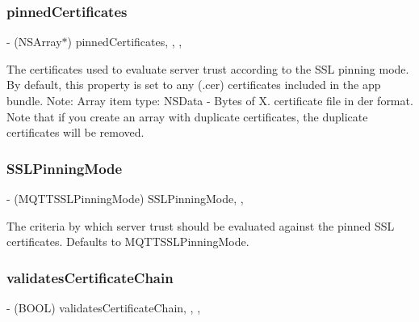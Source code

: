 \subsubsection{\texorpdfstring{pinned\+Certificates}{pinnedCertificates}}
{\footnotesize\ttfamily -\/ (N\+S\+Array$\ast$) pinned\+Certificates\hspace{0.3cm}{\ttfamily [read]}, {\ttfamily [write]}, {\ttfamily [nonatomic]}, {\ttfamily [strong]}}

The certificates used to evaluate server trust according to the S\+SL pinning mode. By default, this property is set to any ({\ttfamily .cer}) certificates included in the app bundle. Note\+: Array item type\+: N\+S\+Data -\/ Bytes of X. certificate file in der format. Note that if you create an array with duplicate certificates, the duplicate certificates will be removed. \mbox{\label{interface_m_q_t_t_s_s_l_security_policy_aca548d3c82c982c275e6c68d92648d89}} 
\subsubsection{\texorpdfstring{S\+S\+L\+Pinning\+Mode}{SSLPinningMode}}
{\footnotesize\ttfamily -\/ (M\+Q\+T\+T\+S\+S\+L\+Pinning\+Mode) S\+S\+L\+Pinning\+Mode\hspace{0.3cm}{\ttfamily [read]}, {\ttfamily [nonatomic]}, {\ttfamily [assign]}}

The criteria by which server trust should be evaluated against the pinned S\+SL certificates. Defaults to {\ttfamily M\+Q\+T\+T\+S\+S\+L\+Pinning\+Mode}. \mbox{\label{interface_m_q_t_t_s_s_l_security_policy_ad54371d7cfb587c908173d032df33dbb}} 
\subsubsection{\texorpdfstring{validates\+Certificate\+Chain}{validatesCertificateChain}}
{\footnotesize\ttfamily -\/ (B\+O\+OL) validates\+Certificate\+Chain\hspace{0.3cm}{\ttfamily [read]}, {\ttfamily [write]}, {\ttfamily [nonatomic]}, {\ttfamily [assign]}}

